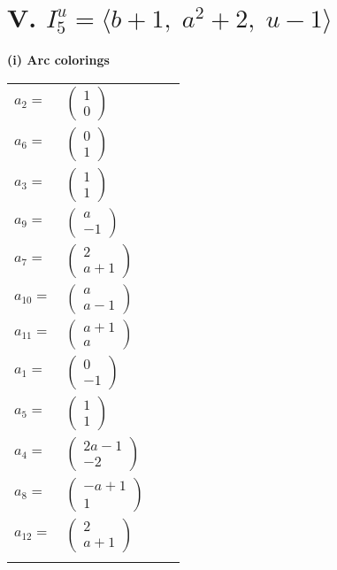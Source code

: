 \documentclass[1p]{elsarticle_modified}
\theoremstyle{definition}
\begin{document}
\centering \section*{V. $I^u_{5}= \langle b+1,\;a^2+2,\;u-1 \rangle$}
\flushleft \textbf{(i) Arc colorings}\\
\begin{tabular}{m{7pt} m{180pt} m{7pt} m{180pt} }
\flushright $a_{2}=$&$\begin{pmatrix}1\\0\end{pmatrix}$ \\
\flushright $a_{6}=$&$\begin{pmatrix}0\\1\end{pmatrix}$ \\
\flushright $a_{3}=$&$\begin{pmatrix}1\\1\end{pmatrix}$ \\
\flushright $a_{9}=$&$\begin{pmatrix}a\\-1\end{pmatrix}$ \\
\flushright $a_{7}=$&$\begin{pmatrix}2\\a+1\end{pmatrix}$ \\
\flushright $a_{10}=$&$\begin{pmatrix}a\\a-1\end{pmatrix}$ \\
\flushright $a_{11}=$&$\begin{pmatrix}a+1\\a\end{pmatrix}$ \\
\flushright $a_{1}=$&$\begin{pmatrix}0\\-1\end{pmatrix}$ \\
\flushright $a_{5}=$&$\begin{pmatrix}1\\1\end{pmatrix}$ \\
\flushright $a_{4}=$&$\begin{pmatrix}2 a-1\\-2\end{pmatrix}$ \\
\flushright $a_{8}=$&$\begin{pmatrix}- a+1\\1\end{pmatrix}$ \\
\flushright $a_{12}=$&$\begin{pmatrix}2\\a+1\end{pmatrix}$\\&\end{tabular}
\end{document}
